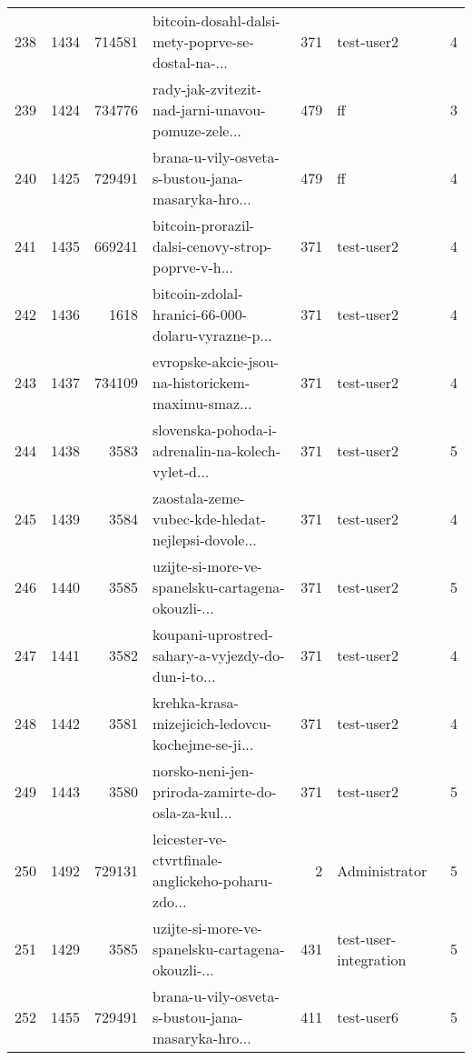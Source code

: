 \begin{tabular}{lrrlrlr}
238  &       1434 &   714581 &  bitcoin-dosahl-dalsi-mety-poprve-se-dostal-na-... &      371 &                   test-user2 &               4 \\
239  &       1424 &   734776 &  rady-jak-zvitezit-nad-jarni-unavou-pomuze-zele... &      479 &                           ff &               3 \\
240  &       1425 &   729491 &  brana-u-vily-osveta-s-bustou-jana-masaryka-hro... &      479 &                           ff &               4 \\
241  &       1435 &   669241 &  bitcoin-prorazil-dalsi-cenovy-strop-poprve-v-h... &      371 &                   test-user2 &               4 \\
242  &       1436 &     1618 &  bitcoin-zdolal-hranici-66-000-dolaru-vyrazne-p... &      371 &                   test-user2 &               4 \\
243  &       1437 &   734109 &  evropske-akcie-jsou-na-historickem-maximu-smaz... &      371 &                   test-user2 &               4 \\
244  &       1438 &     3583 &  slovenska-pohoda-i-adrenalin-na-kolech-vylet-d... &      371 &                   test-user2 &               5 \\
245  &       1439 &     3584 &  zaostala-zeme-vubec-kde-hledat-nejlepsi-dovole... &      371 &                   test-user2 &               4 \\
246  &       1440 &     3585 &  uzijte-si-more-ve-spanelsku-cartagena-okouzli-... &      371 &                   test-user2 &               5 \\
247  &       1441 &     3582 &  koupani-uprostred-sahary-a-vyjezdy-do-dun-i-to... &      371 &                   test-user2 &               4 \\
248  &       1442 &     3581 &  krehka-krasa-mizejicich-ledovcu-kochejme-se-ji... &      371 &                   test-user2 &               4 \\
249  &       1443 &     3580 &  norsko-neni-jen-priroda-zamirte-do-osla-za-kul... &      371 &                   test-user2 &               5 \\
250  &       1492 &   729131 &  leicester-ve-ctvrtfinale-anglickeho-poharu-zdo... &        2 &                Administrator &               5 \\
251  &       1429 &     3585 &  uzijte-si-more-ve-spanelsku-cartagena-okouzli-... &      431 &        test-user-integration &               5 \\
252  &       1455 &   729491 &  brana-u-vily-osveta-s-bustou-jana-masaryka-hro... &      411 &                   test-user6 &               5 \\

\end{tabular}
